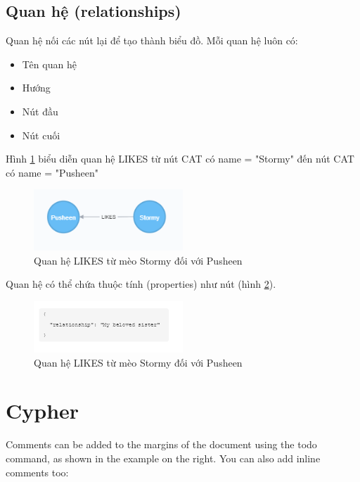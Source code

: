 \subsection{Quan hệ (relationships)}
Quan hệ nối các nút lại để tạo thành biểu đồ. Mỗi quan hệ luôn có: 

\begin{itemize}
\item Tên quan hệ
\item Hướng 
\item Nút đầu
\item Nút cuối
\end{itemize}

Hình \ref{fig:relationships} biểu diễn quan hệ LIKES từ nút CAT có name = "Stormy" đến nút CAT có name = "Pusheen"

\begin{figure}[h]
\centering
\includegraphics[width=0.5\textwidth]{image/relationships.PNG}
\caption{\label{fig:relationships} Quan hệ LIKES từ mèo Stormy đối với Pusheen}
\end{figure}

Quan hệ có thể chứa thuộc tính (properties) như nút (hình \ref{fig:relationshipsprop}). 

\begin{figure}[h]
\centering
\includegraphics[width=0.5\textwidth]{image/quan_he_thuoc_tin.PNG}
\caption{\label{fig:relationshipsprop} Quan hệ LIKES từ mèo Stormy đối với Pusheen}
\end{figure}


\section{Cypher}



Comments can be added to the margins of the document using the  todo command, as shown in the example on the right. You can also add inline comments too:

